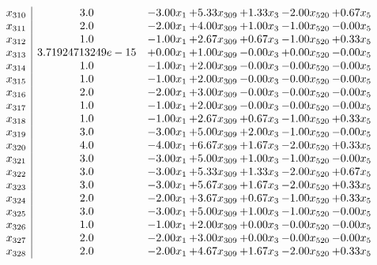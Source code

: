 \documentclass[8pt]{article}
\begin{document}
\[\begin{array}{c| c c@{\hskip 2pt} c@{\hskip 2pt} c@{\hskip 2pt} c@{\hskip 2pt} c@{\hskip 2pt} }
 x_{310}   &  3.0 & -3.00 x_{1} & +  5.33 x_{309} & +  1.33 x_{3} & -2.00 x_{520} & +  0.67 x_{5}\\
 x_{311}   &  2.0 & -2.00 x_{1} & +  4.00 x_{309} & +  1.00 x_{3} & -1.00 x_{520} & -0.00 x_{5}\\
 x_{312}   &  1.0 & -1.00 x_{1} & +  2.67 x_{309} & +  0.67 x_{3} & -1.00 x_{520} & +  0.33 x_{5}\\
 x_{313}   &  3.71924713249e-15 & +  0.00 x_{1} & +  1.00 x_{309} & -0.00 x_{3} & +  0.00 x_{520} & -0.00 x_{5}\\
 x_{314}   &  1.0 & -1.00 x_{1} & +  2.00 x_{309} & -0.00 x_{3} & -0.00 x_{520} & -0.00 x_{5}\\
 x_{315}   &  1.0 & -1.00 x_{1} & +  2.00 x_{309} & -0.00 x_{3} & -0.00 x_{520} & -0.00 x_{5}\\
 x_{316}   &  2.0 & -2.00 x_{1} & +  3.00 x_{309} & -0.00 x_{3} & -0.00 x_{520} & -0.00 x_{5}\\
 x_{317}   &  1.0 & -1.00 x_{1} & +  2.00 x_{309} & -0.00 x_{3} & -0.00 x_{520} & -0.00 x_{5}\\
 x_{318}   &  1.0 & -1.00 x_{1} & +  2.67 x_{309} & +  0.67 x_{3} & -1.00 x_{520} & +  0.33 x_{5}\\
 x_{319}   &  3.0 & -3.00 x_{1} & +  5.00 x_{309} & +  2.00 x_{3} & -1.00 x_{520} & -0.00 x_{5}\\
 x_{320}   &  4.0 & -4.00 x_{1} & +  6.67 x_{309} & +  1.67 x_{3} & -2.00 x_{520} & +  0.33 x_{5}\\
 x_{321}   &  3.0 & -3.00 x_{1} & +  5.00 x_{309} & +  1.00 x_{3} & -1.00 x_{520} & -0.00 x_{5}\\
 x_{322}   &  3.0 & -3.00 x_{1} & +  5.33 x_{309} & +  1.33 x_{3} & -2.00 x_{520} & +  0.67 x_{5}\\
 x_{323}   &  3.0 & -3.00 x_{1} & +  5.67 x_{309} & +  1.67 x_{3} & -2.00 x_{520} & +  0.33 x_{5}\\
 x_{324}   &  2.0 & -2.00 x_{1} & +  3.67 x_{309} & +  0.67 x_{3} & -1.00 x_{520} & +  0.33 x_{5}\\
 x_{325}   &  3.0 & -3.00 x_{1} & +  5.00 x_{309} & +  1.00 x_{3} & -1.00 x_{520} & -0.00 x_{5}\\
 x_{326}   &  1.0 & -1.00 x_{1} & +  2.00 x_{309} & +  0.00 x_{3} & -0.00 x_{520} & -0.00 x_{5}\\
 x_{327}   &  2.0 & -2.00 x_{1} & +  3.00 x_{309} & +  0.00 x_{3} & -0.00 x_{520} & -0.00 x_{5}\\
 x_{328}   &  2.0 & -2.00 x_{1} & +  4.67 x_{309} & +  1.67 x_{3} & -2.00 x_{520} & +  0.33 x_{5}\\

\end{array}\]
\end{document}
